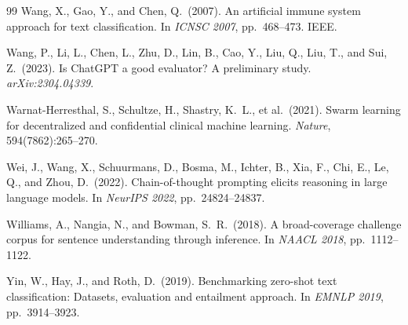 \documentclass[11pt,a4paper]{article}
\begin{document}
\begin{thebibliography}{99}
Wang, X., Gao, Y., and Chen, Q.\ (2007).
\newblock An artificial immune system approach for text classification.
\newblock In \textit{ICNSC 2007}, pp.\ 468--473. IEEE.

Wang, P., Li, L., Chen, L., Zhu, D., Lin, B., Cao, Y., Liu, Q., Liu, T., and
  Sui, Z.\ (2023).
\newblock Is {ChatGPT} a good evaluator? {A} preliminary study.
\newblock \textit{arXiv:2304.04339}.

Warnat-Herresthal, S., Schultze, H., Shastry, K.~L., et al.\ (2021).
\newblock Swarm learning for decentralized and confidential clinical machine
  learning.
\newblock \textit{Nature}, 594(7862):265--270.

Wei, J., Wang, X., Schuurmans, D., Bosma, M., Ichter, B., Xia, F., Chi, E.,
  Le, Q., and Zhou, D.\ (2022).
\newblock Chain-of-thought prompting elicits reasoning in large language models.
\newblock In \textit{NeurIPS 2022}, pp.\ 24824--24837.

Williams, A., Nangia, N., and Bowman, S.~R.\ (2018).
\newblock A broad-coverage challenge corpus for sentence understanding through
  inference.
\newblock In \textit{NAACL 2018}, pp.\ 1112--1122.

Yin, W., Hay, J., and Roth, D.\ (2019).
\newblock Benchmarking zero-shot text classification: Datasets, evaluation and
  entailment approach.
\newblock In \textit{EMNLP 2019}, pp.\ 3914--3923.

\end{thebibliography}
\end{document}
